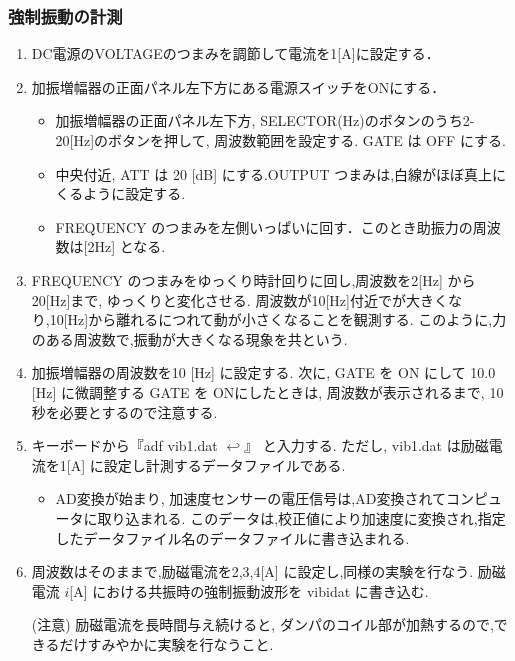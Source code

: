 \documentclass[a4paper,10.5pt]{jsarticle}
\begin{document}
\subsubsection{強制振動の計測}
\begin{enumerate}
  \item DC電源のVOLTAGEのつまみを調節して電流を1[A]に設定する．
  \item 加振増幅器の正面パネル左下方にある電源スイッチをONにする．
  \begin{itemize}
    \item 加振増幅器の正面パネル左下方, SELECTOR(Hz)のボタンのうち2-20[Hz]のボタンを押して,
    周波数範囲を設定する. GATE は OFF にする.
    \item 中央付近, ATT は 20 [dB] にする.OUTPUT つまみは,白線がほぼ真上にくるように設定する.
    \item FREQUENCY のつまみを左側いっぱいに回す．このとき助振力の周波数は[2Hz] となる.
  \end{itemize}
  \item FREQUENCY のつまみをゆっくり時計回りに回し,周波数を2[Hz] から 20[Hz]まで,
  ゆっくりと変化させる. 
  周波数が10[Hz]付近でが大きくなり,10[Hz]から離れるにつれて動が小さくなることを観測する. このように,力のある周波数で,振動が大きくなる現象を共という.
  \item 加振増幅器の周波数を10 [Hz] に設定する. 次に, GATE を ON にして 10.0 [Hz] に微調整する GATE を ONにしたときは,
  周波数が表示されるまで, 10 秒を必要とするので注意する. 
  \item キーボードから『adf vib1.dat  $\hookleftarrow$』 と入力する. 
  ただし, vib1.dat は励磁電流を1[A] に設定し計測するデータファイルである.
  \begin{itemize}
    \item  AD変換が始まり, 加速度センサーの電圧信号は,AD変換されてコンピュータに取り込まれる.
    このデータは,校正値により加速度に変換され,指定したデータファイル名のデータファイルに書き込まれる.
  \end{itemize}
  \item 周波数はそのままで,励磁電流を2,3,4[A] に設定し,同様の実験を行なう. 励磁電流 $i$[A] における共振時の強制振動波形を vibidat に書き込む.
  
  (注意) 励磁電流を長時間与え続けると, ダンパのコイル部が加熱するので,できるだけすみやかに実験を行なうこと.
\end{enumerate}
\end{document}
